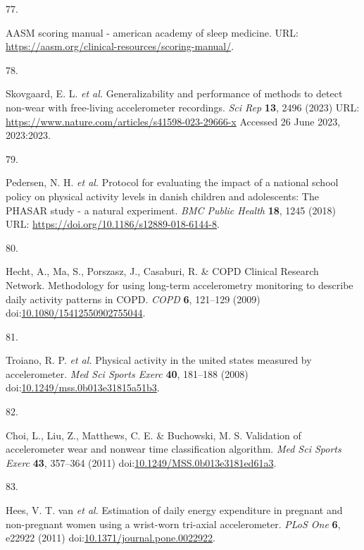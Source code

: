 \documentclass[
  9pt,
]{scrbook}
\newlength{\cslhangindent}
\newlength{\csllabelwidth}
\newlength{\cslentryspacingunit} %
\newenvironment{CSLReferences}[2] %
 {%
  \setlength{\parindent}{0pt}
  \ifodd #1
  \let\oldpar\par
  \def\par{\hangindent=\cslhangindent\oldpar}
  \fi
  \setlength{\parskip}{#2\cslentryspacingunit}
 }%
 {}
\newcommand{\CSLLeftMargin}[1]{\parbox[t]{\csllabelwidth}{#1}}
\newcommand{\CSLRightInline}[1]{\parbox[t]{\linewidth - \csllabelwidth}{#1}\break}
\begin{document}
\begin{CSLReferences}{0}{0}
\leavevmode{}%
\CSLLeftMargin{77. }%
\CSLRightInline{AASM scoring manual - american academy of sleep
medicine. URL:
\url{https://aasm.org/clinical-resources/scoring-manual/}.}

\leavevmode{}%
\CSLLeftMargin{78. }%
\CSLRightInline{Skovgaard, E. L. \emph{et al.} Generalizability and
performance of methods to detect non-wear with free-living accelerometer
recordings. \emph{Sci Rep} \textbf{13}, 2496 (2023) URL:
\url{https://www.nature.com/articles/s41598-023-29666-x} Accessed 26
June 2023, 2023:2023.}

\leavevmode{}%
\CSLLeftMargin{79. }%
\CSLRightInline{Pedersen, N. H. \emph{et al.} Protocol for evaluating
the impact of a national school policy on physical activity levels in
danish children and adolescents: The PHASAR study - a natural
experiment. \emph{BMC Public Health} \textbf{18}, 1245 (2018) URL:
\url{https://doi.org/10.1186/s12889-018-6144-8}.}

\leavevmode{}%
\CSLLeftMargin{80. }%
\CSLRightInline{Hecht, A., Ma, S., Porszasz, J., Casaburi, R. \& COPD
Clinical Research Network. Methodology for using long-term accelerometry
monitoring to describe daily activity patterns in {COPD}. \emph{{COPD}}
\textbf{6}, 121--129 (2009)
doi:\href{https://doi.org/10.1080/15412550902755044}{10.1080/15412550902755044}.}

\leavevmode{}%
\CSLLeftMargin{81. }%
\CSLRightInline{Troiano, R. P. \emph{et al.} Physical activity in the
united states measured by accelerometer. \emph{Med Sci Sports Exerc}
\textbf{40}, 181--188 (2008)
doi:\href{https://doi.org/10.1249/mss.0b013e31815a51b3}{10.1249/mss.0b013e31815a51b3}.}

\leavevmode{}%
\CSLLeftMargin{82. }%
\CSLRightInline{Choi, L., Liu, Z., Matthews, C. E. \& Buchowski, M. S.
Validation of accelerometer wear and nonwear time classification
algorithm. \emph{Med Sci Sports Exerc} \textbf{43}, 357--364 (2011)
doi:\href{https://doi.org/10.1249/MSS.0b013e3181ed61a3}{10.1249/MSS.0b013e3181ed61a3}.}

\leavevmode{}%
\CSLLeftMargin{83. }%
\CSLRightInline{Hees, V. T. van \emph{et al.} Estimation of daily energy
expenditure in pregnant and non-pregnant women using a wrist-worn
tri-axial accelerometer. \emph{{PLoS} One} \textbf{6}, e22922 (2011)
doi:\href{https://doi.org/10.1371/journal.pone.0022922}{10.1371/journal.pone.0022922}.}


\end{CSLReferences}
\end{document}
